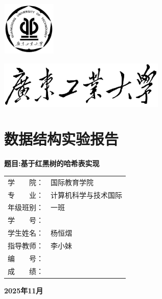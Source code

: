 \documentclass[12pt,a4paper]{article}
\begin{document}
\begin{center}
\includegraphics[width=1.02431in,height=1.01319in,alt={广东工业大学校徽}]{media/image1.png}

\includegraphics[width=3.13333in,height=0.88333in,alt={广东工业大学校名}]{media/image2.png}

\section*{\textbf{\fontsize{26pt}{30pt}\selectfont 数据结构实验报告}}
\label{sec:data_structure_lab_report}
\vspace{0.5cm}
\textbf{\fontsize{22pt}{26pt}\selectfont 题目:基于红黑树的哈希表实现}

\vspace{2cm}
\begin{tabular}{ll}
\fontsize{16pt}{19pt}\selectfont 学　　院： & \fontsize{16pt}{19pt}\selectfont 国际教育学院\\
\fontsize{16pt}{19pt}\selectfont 专　　业： & \fontsize{16pt}{19pt}\selectfont 计算机科学与技术国际\\
\fontsize{16pt}{19pt}\selectfont 年级班别： & \fontsize{16pt}{19pt}\selectfont 一班\\
\fontsize{16pt}{19pt}\selectfont 学　　号： & \fontsize{16pt}{19pt}\selectfont 3124009862\\
\fontsize{16pt}{19pt}\selectfont 学生姓名： & \fontsize{16pt}{19pt}\selectfont 杨恒熠\\
\fontsize{16pt}{19pt}\selectfont 指导教师： & \fontsize{16pt}{19pt}\selectfont 李小妹\\
\fontsize{16pt}{19pt}\selectfont 编　　号： & \fontsize{16pt}{19pt}\selectfont \dotfill\\
\fontsize{16pt}{19pt}\selectfont 成　　绩： & \fontsize{16pt}{19pt}\selectfont \dotfill\\
\end{tabular}
\vfill
\textbf{2025年11月}
\end{center}
\end{document}
